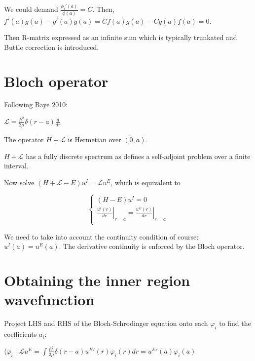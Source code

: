 \documentclass[12pt, a4paper]{article}
\begin{document}
We could demand $\frac{\phi_i'(a)}{\phi(a)} = C$. Then, $f'(a) g(a) - g'(a) g(a) = C f(a) g(a) - C g(a) f(a) = 0$.

Then R-matrix expressed as an infinite sum which is typically trunkated and Buttle correction is introduced.


\section{Bloch operator}
Following Baye 2010:

$\mathcal{L} = \frac{\hbar^2}{2 \mu} \delta(r - a) \frac{d}{dr}$


The operator $H + \mathcal{L}$ is Hermetian over $(0, a)$. 

$H + \mathcal{L}$ has a fully discrete spectrum as defines a self-adjoint problem over a finite interval. 

Now solve $(H + \mathcal{L} - E) u^I = \mathcal{L} u^E$, which is equivalent  to

$$\begin{cases}
(H - E) u^I = 0 \\
\left.\frac{u^I(r)}{dr}\right|_{r = a} = \left.\frac{u^E(r)}{dr}\right|_{r = a} \\
\end{cases}$$

We need to take into account the continuity condition of course: $u^I(a) = u^E(a)$. The derivative continuity is enforced by the Bloch operator. 

\section{Obtaining the inner region wavefunction}
Project LHS and RHS of the Bloch-Schrodinger equation onto each $\varphi_i$ to find the coefficients $a_i$:



$\langle \varphi_i \mid \mathcal{L} u^E = \int\limits \frac{\hbar^2}{2 \mu} \delta(r - a) {u^E}'(r) \varphi_i(r) dr = {u^E}'(a) \varphi_i(a)$ 
\end{document}
